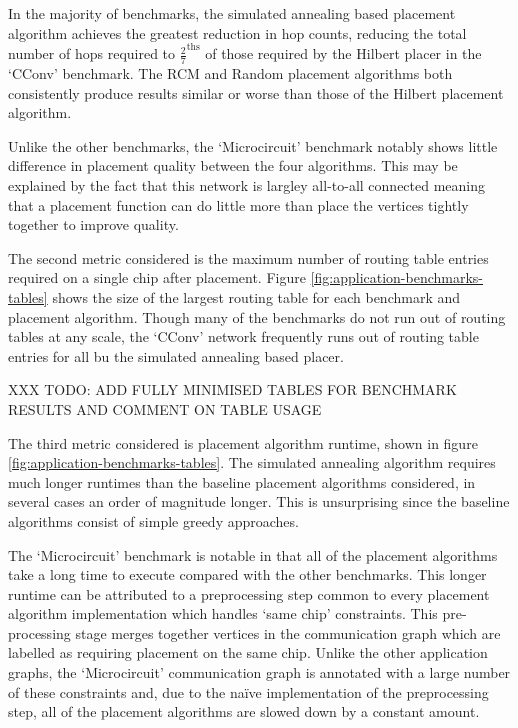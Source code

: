 			In the majority of benchmarks, the simulated annealing based placement
			algorithm achieves the greatest reduction in hop counts, reducing the
			total number of hops required to $\frac{2}{7}^\textrm{ths}$ of those
			required by the Hilbert placer in the `CConv' benchmark. The RCM and
			Random placement algorithms both consistently produce results similar or
			worse than those of the Hilbert placement algorithm.
			
			Unlike the other benchmarks, the `Microcircuit' benchmark notably shows
			little difference in placement quality between the four algorithms. This
			may be explained by the fact that this network is largley all-to-all
			connected meaning that a placement function can do little more than place
			the vertices tightly together to improve quality.
			
			The second metric considered is the maximum number of routing table
			entries required on a single chip after placement. Figure
			\ref{fig:application-benchmarks-tables} shows the size of the largest
			routing table for each benchmark and placement algorithm. Though many of
			the benchmarks do not run out of routing tables at any scale, the `CConv'
			network frequently runs out of routing table entries for all bu the
			simulated annealing based placer.
			
			XXX TODO: ADD FULLY MINIMISED TABLES FOR BENCHMARK RESULTS AND COMMENT ON
			TABLE USAGE
			
			The third metric considered is placement algorithm runtime, shown in
			figure \ref{fig:application-benchmarks-tables}. The simulated annealing
			algorithm requires much longer runtimes than the baseline placement
			algorithms considered, in several cases an order of magnitude longer.
			This is unsurprising since the baseline algorithms consist of simple
			greedy approaches.
			
			The `Microcircuit' benchmark is notable in that all of the placement
			algorithms take a long time to execute compared with the other
			benchmarks. This longer runtime can be attributed to a preprocessing step
			common to every placement algorithm implementation which handles `same
			chip' constraints. This pre-processing stage merges together vertices in
			the communication graph which are labelled as requiring placement on the
			same chip. Unlike the other application graphs, the `Microcircuit'
			communication graph is annotated with a large number of these constraints
			and, due to the na\"ive implementation of the preprocessing step, all of
			the placement algorithms are slowed down by a constant amount.
			
